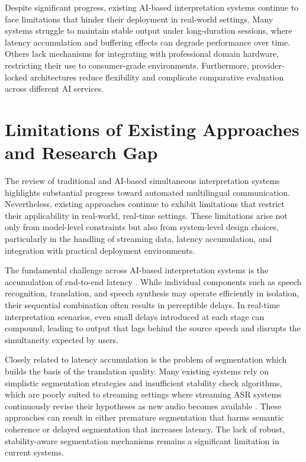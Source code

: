 Despite significant progress, existing AI-based interpretation systems continue to face limitations that hinder their deployment in real-world settings. Many systems struggle to maintain stable output under long-duration sessions, where latency accumulation and buffering effects can degrade performance over time. Others lack mechanisms for integrating with professional domain hardware, restricting their use to consumer-grade environments. Furthermore, provider-locked architectures reduce flexibility and complicate comparative evaluation across different AI services.



\section{Limitations of Existing Approaches and Research Gap}

The review of traditional and AI-based simultaneous interpretation systems highlights substantial progress toward automated multilingual communication\cite{ozkaya2023transformative, papi-etal-2022-laal}. Nevertheless, existing approaches continue to exhibit limitations that restrict their applicability in real-world, real-time settings. These limitations arise not only from model-level constraints but also from system-level design choices, particularly in the handling of streaming data, latency accumulation, and integration with practical deployment environments.

The fundamental challenge across AI-based interpretation systems is the accumulation of end-to-end latency \cite{zheng-etal-2020-fluent, ma2019staclarxiv, dhawan2022speech2speechchallenges}. While individual components such as speech recognition, translation, and speech synthesis may operate efficiently in isolation, their sequential combination often results in perceptible delays. In real-time interpretation scenarios, even small delays introduced at each stage can compound, leading to output that lags behind the source speech and disrupts the simultaneity expected by users.

Closely related to latency accumulation is the problem of segmentation which builds the basis of the translation quality. Many existing systems rely on simplistic segmentation strategies and insufficient stability check algorithms, which are poorly suited to streaming settings where streaming ASR systems continuously revise their hypotheses as new audio becomes available \cite{cho2016anticipation, chen2024metamorphosisMT}. These approaches can result in either premature segmentation that harms semantic coherence or delayed segmentation that increases latency. The lack of robust, stability-aware segmentation mechanisms remains a significant limitation in current systems.

